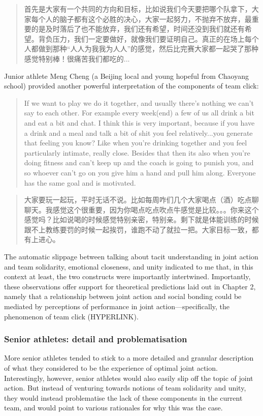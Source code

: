 \begin{CJK}{UTF8}{gbsn}
    \begin{quotation}
      首先是大家有一个共同的方向和目标，比如说我们今天要把哪个队拿下，大家每个人的脑子都有这个必胜的决心，大家一起努力，不抛弃不放弃，最重要的是及时落后了也不能放弃，我们还有希望，时间还没到我们就还有希望。背负压力，我们一定要做好，就像我们要证明自己。真正的在场上每个人都做到那种“人人为我我为人人”的感觉，然后比完赛大家都一起哭了那种感觉特别棒！很痛苦我们都吃的...
    \end{quotation}


Junior athlete Meng Cheng (a Beijing local and young hopeful from Chaoyang school) provided another powerful interpretation of the components of team click:

      \begin{quotation}
        If we want to play we do it together, and usually there’s nothing we can’t say to each other. For example every week(end) a few of us all drink a bit and eat a bit and chat.  I think this is very important, because if you have a drink and a meal and talk a bit of shit you feel relatively...you generate that feeling you know? Like when you’re drinking together and you feel particularly intimate, really close.  Besides that then its also when you’re doing fitness and can’t keep up and the coach is going to punish you, and so whoever can’t go on you give him a hand and pull him along.  Everyone has the same goal and is motivated.
      \end{quotation}

      \begin{quotation}
        大家要玩一起玩，平时无话不说。比如每周咋们几个大家喝点（酒）吃点聊聊天。我感觉这个很重要，因为你喝点吃点吹点牛感觉是比较。。。你来这个感觉吗？比如说喝的时候感觉特别亲密，特别亲。剩下就是体能训练的时候跟不上教练要罚的时候一起挨罚，谁跑不动了就拉一把。大家目标一致，都有上进心。 
      \end{quotation}


The automatic slippage between talking about tacit understanding in joint action and team solidarity, emotional closeness, and unity indicated to me that, in this context at least, the two constructs were importantly intertwined. Importantly, these observations offer support for theoretical predictions laid out in Chapter 2, namely that a relationship between joint action and social bonding could be mediated by perceptions of performance in joint action---specifically, the phenomenon of team click (HYPERLINK).


\subsubsection{Senior athletes: detail and problematisation}
More senior athletes tended to stick to a more detailed and granular description of what they considered to be the experience of optimal joint action. Interestingly, however, senior athletes would also easily slip off the topic of joint action.  But instead of venturing towards notions of team solidarity and unity, they would instead problematise the lack of these components in the current team, and would point to various rationales for why this was the case.


\end{CJK}
